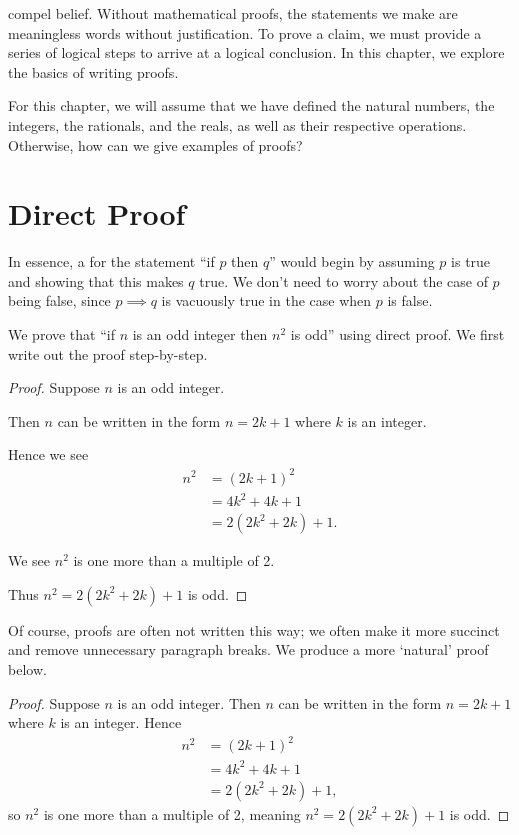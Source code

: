  compel belief. Without mathematical proofs, the statements we make are meaningless words without justification. To prove a claim, we must provide a series of logical steps to arrive at a logical conclusion. In this chapter, we explore the basics of writing proofs.

For this chapter, we will assume that we have defined the natural numbers, the integers, the rationals, and the reals, as well as their respective operations. Otherwise, how can we give examples of proofs?

\section{Direct Proof}
In essence, a  for the statement ``if $p$ then $q$'' would begin by assuming $p$ is true and showing that this makes $q$ true. We don't need to worry about the case of $p$ being false, since $p \implies q$ is vacuously true in the case when $p$ is false.

\begin{example}
    \setlength{\parindent}{1.5em}
    We prove that ``if $n$ is an odd integer then $n^2$ is odd'' using direct proof. We first write out the proof step-by-step.
    \begin{proof}
        Suppose $n$ is an odd integer.

        Then $n$ can be written in the form $n = 2k + 1$ where $k$ is an integer.

        Hence we see
        \begin{align*}
            n^2 &= (2k+1)^2\\
            &= 4k^2 + 4k + 1\\
            &= 2(2k^2 + 2k) + 1.
        \end{align*}

        We see $n^2$ is one more than a multiple of 2.

        Thus $n^2 = 2(2k^2 + 2k) + 1$ is odd.
    \end{proof}

    Of course, proofs are often not written this way; we often make it more succinct and remove unnecessary paragraph breaks. We produce a more `natural' proof below.
    \begin{proof}
        Suppose $n$ is an odd integer. Then $n$ can be written in the form $n = 2k + 1$ where $k$ is an integer. Hence
        \begin{align*}
            n^2 &= (2k+1)^2\\
            &= 4k^2 + 4k + 1\\
            &= 2(2k^2 + 2k) + 1,
        \end{align*}
        so $n^2$ is one more than a multiple of 2, meaning $n^2 = 2(2k^2 + 2k) + 1$ is odd.
    \end{proof}
\end{example}

